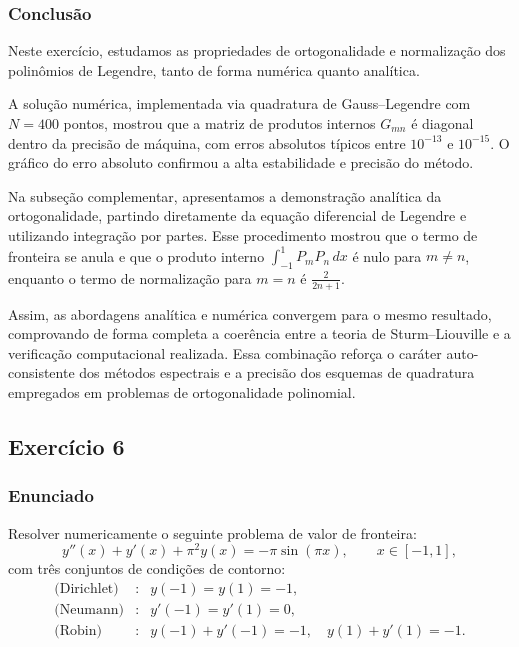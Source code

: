 \documentclass[12pt,a4paper]{article}
\begin{document}
\subsubsection{Conclusão}

Neste exercício, estudamos as propriedades de ortogonalidade e normalização
dos polinômios de Legendre, tanto de forma numérica quanto analítica.

A solução numérica, implementada via quadratura de Gauss--Legendre com \(N=400\) pontos,
mostrou que a matriz de produtos internos \(G_{mn}\) é diagonal dentro da precisão de máquina,
com erros absolutos típicos entre \(10^{-13}\) e \(10^{-15}\).
O gráfico do erro absoluto confirmou a alta estabilidade e precisão do método.

Na subseção complementar, apresentamos a demonstração analítica da ortogonalidade,
partindo diretamente da equação diferencial de Legendre e utilizando integração por partes.
Esse procedimento mostrou que o termo de fronteira se anula
e que o produto interno \(\int_{-1}^{1} P_m P_n\,dx\) é nulo para \(m \ne n\),
enquanto o termo de normalização para \(m = n\) é \(\frac{2}{2n+1}\).

Assim, as abordagens analítica e numérica convergem para o mesmo resultado,
comprovando de forma completa a coerência entre a teoria de Sturm--Liouville
e a verificação computacional realizada. Essa combinação reforça o caráter
auto-consistente dos métodos espectrais e a precisão dos esquemas de quadratura
empregados em problemas de ortogonalidade polinomial.


\newpage

\subsection{Exercício 6}

\subsubsection{Enunciado}
Resolver numericamente o seguinte problema de valor de fronteira:
\[
y''(x) + y'(x) + \pi^2 y(x) = -\pi \sin(\pi x), \qquad x \in [-1,1],
\]
com três conjuntos de condições de contorno:
\begin{align*}
\text{(Dirichlet)} &:& y(-1) = y(1) = -1, \\
\text{(Neumann)} &:& y'(-1) = y'(1) = 0, \\
\text{(Robin)} &:& y(-1)+y'(-1)=-1, \quad y(1)+y'(1)=-1.
\end{align*}
\end{document}
